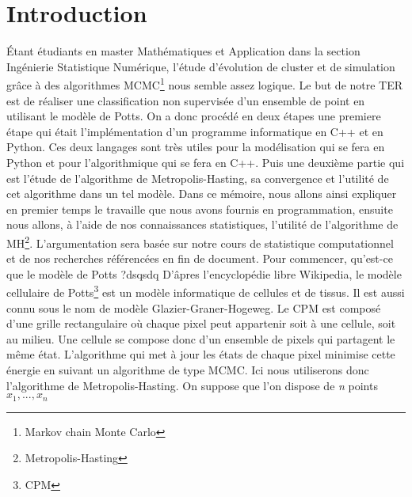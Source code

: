 \chapter*{Introduction}
\newcommand\tab[1][0.8cm]{\hspace*{#1}}


    Étant étudiants en master Mathématiques et Application dans la section Ingénierie Statistique Numérique, l'étude d'évolution de cluster et de simulation grâce à des algorithmes MCMC\footnote{Markov chain Monte Carlo} nous semble assez logique.
Le but de notre TER est de réaliser une classification non supervisée d'un ensemble de point en utilisant le modèle de Potts.
On a donc procédé en deux étapes une premiere étape qui était l'implémentation d'un programme informatique en C++ et en Python.
Ces deux langages sont très utiles pour la modélisation qui se fera en Python et pour l'algorithmique qui se fera en C++.
Puis une deuxième partie qui est l'étude de l'algorithme de Metropolis-Hasting, sa convergence et l'utilité de cet algorithme dans un tel modèle.
Dans ce mémoire, nous allons ainsi expliquer en premier temps le travaille que nous avons fournis en programmation, ensuite nous allons, à l'aide de nos connaissances statistiques, l'utilité de l'algorithme de MH\footnote{Metropolis-Hasting}.
    \newline L'argumentation sera basée sur notre cours de statistique computationnel et de nos recherches référencées en fin de document.
    \newline \newline
    \tab Pour commencer, qu'est-ce que le modèle de Potts ?dsqsdq
    \newline D'âpres l'encyclopédie libre Wikipedia, le modèle cellulaire de Potts\footnote{CPM} est un modèle informatique de cellules et de tissus.
    Il est aussi connu sous le nom de modèle Glazier-Graner-Hogeweg.
    Le CPM est composé d'une grille rectangulaire où chaque pixel peut appartenir soit à une cellule, soit au milieu.
    Une cellule se compose donc d'un ensemble de pixels qui partagent le même état.
    L'algorithme qui met à jour les états de chaque pixel minimise cette énergie en suivant un algorithme de type MCMC.
    Ici nous utiliserons donc l'algorithme de Metropolis-Hasting.
    On suppose que l’on dispose de \textit{n} points $x_{1},...,x_{n}$
